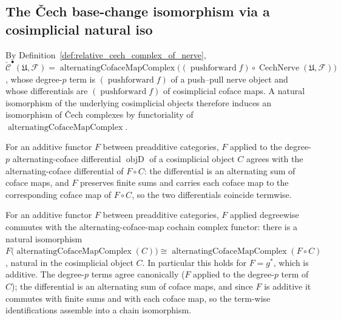 \subsection{The {\v C}ech base-change isomorphism via a cosimplicial natural iso}
\label{sec:cech_base_change_construction}

By Definition~\ref{def:relative_cech_complex_of_nerve},
\(\check{\mathcal{C}}^\bullet(\mathfrak{U}, \mathcal{F}) =
\operatorname{alternatingCofaceMapComplex}\bigl((\operatorname{pushforward} f) \circ
\operatorname{CechNerve}(\mathfrak{U}, \mathcal{F})\bigr)\), whose degree-\(p\) term is
\((\operatorname{pushforward} f)\) of a push--pull nerve object and whose differentials
are \((\operatorname{pushforward} f)\) of cosimplicial coface maps. A natural
isomorphism of the underlying cosimplicial objects therefore induces an isomorphism
of {\v C}ech complexes by functoriality of
\(\operatorname{alternatingCofaceMapComplex}\).

\begin{lemma}\leanok
  \label{lem:map_alternatingCofaceMapComplex_objD}
  For an additive functor \(F\) between preadditive categories, \(F\) applied to the
  degree-\(p\) alternating-coface differential \(\operatorname{objD}\) of a cosimplicial
  object \(C\) agrees with the alternating-coface differential of \(F \circ C\): the
  differential is an alternating sum of coface maps, and \(F\) preserves finite sums and
  carries each coface map to the corresponding coface map of \(F \circ C\), so the two
  differentials coincide termwise.
\end{lemma}

\begin{lemma}\leanok
  \label{lem:pullback_commutes_alternatingCofaceMapComplex}
  For an additive functor \(F\) between preadditive categories, \(F\) applied
  degreewise commutes with the alternating-coface-map cochain complex functor: there is
  a natural isomorphism
  \(F\bigl(\operatorname{alternatingCofaceMapComplex}(C)\bigr) \cong
  \operatorname{alternatingCofaceMapComplex}(F \circ C)\), natural in the cosimplicial
  object \(C\). In particular this holds for \(F = g^*\), which is additive.
  The degree-\(p\) terms agree canonically (\(F\) applied to the
  degree-\(p\) term of \(C\)); the differential is an alternating sum of coface maps,
  and since \(F\) is additive it commutes with finite sums and with each coface map, so
  the term-wise identifications assemble into a chain isomorphism.
\end{lemma}

